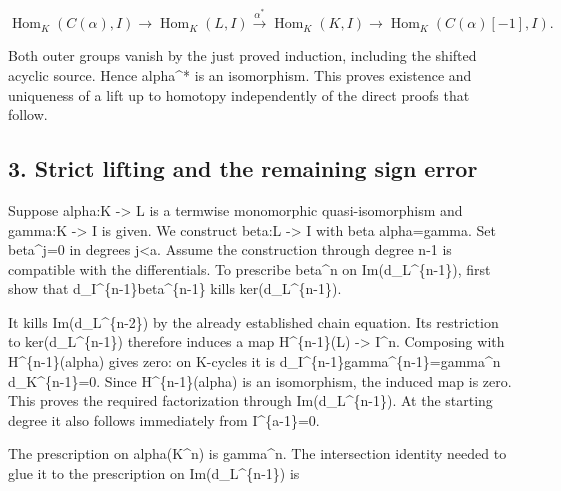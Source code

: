 \[
 \operatorname{Hom}_K(C(\alpha),I)\longrightarrow
 \operatorname{Hom}_K(L,I)\xrightarrow{\alpha^*}
 \operatorname{Hom}_K(K,I)\longrightarrow
 \operatorname{Hom}_K(C(\alpha)[-1],I).
\]

Both outer groups vanish by the just proved induction,\allowbreak{} including the shifted acyclic source. Hence alpha\^{}* is an isomorphism. This proves existence and uniqueness of a lift up to homotopy independently of the direct proofs that follow.

\subsection{3. Strict lifting and the remaining sign error}\label{proofs-6209-7089-strict-lifting-and-the-remaining-sign-error}

Suppose alpha:\allowbreak{}K \allowbreak{}-> L is a termwise monomorphic quasi-isomorphism and gamma:\allowbreak{}K \allowbreak{}-> I is given. We construct beta:\allowbreak{}L \allowbreak{}-> I with beta alpha\allowbreak{}=gamma. Set beta\textasciicircum{}j\allowbreak{}=0 in degrees j\textless a. Assume the construction through degree n-1 is compatible with the differentials. To prescribe beta\^{}n on Im(d\_\allowbreak{}L\textasciicircum{}\{n-1\})\allowbreak{},\allowbreak{} first show that d\_\allowbreak{}I\textasciicircum{}\{n-1\}beta\textasciicircum{}\{n-1\} kills ker(d\_\allowbreak{}L\textasciicircum{}\{n-1\})\allowbreak{}.

It kills Im(d\_\allowbreak{}L\textasciicircum{}\{n-2\})\allowbreak{} by the already established chain equation. Its restriction to ker(d\_\allowbreak{}L\textasciicircum{}\{n-1\})\allowbreak{} therefore induces a map H\textasciicircum{}\{n-1\}(L)\allowbreak{} \allowbreak{}-> I\^{}n. Composing with H\textasciicircum{}\{n-1\}(alpha)\allowbreak{} gives zero:\allowbreak{} on K-cycles it is d\_\allowbreak{}I\textasciicircum{}\{n-1\}gamma\textasciicircum{}\{n-1\}\allowbreak{}=gamma\textasciicircum{}n d\_\allowbreak{}K\textasciicircum{}\{n-1\}\allowbreak{}=0. Since H\textasciicircum{}\{n-1\}(alpha)\allowbreak{} is an isomorphism,\allowbreak{} the induced map is zero. This proves the required factorization through Im(d\_\allowbreak{}L\textasciicircum{}\{n-1\})\allowbreak{}. At the starting degree it also follows immediately from I\textasciicircum{}\{a-1\}\allowbreak{}=0.

The prescription on alpha(K\textasciicircum{}n)\allowbreak{} is gamma\^{}n. The intersection identity needed to glue it to the prescription on Im(d\_\allowbreak{}L\textasciicircum{}\{n-1\})\allowbreak{} is

